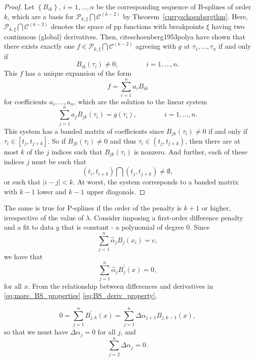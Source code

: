 \documentclass[12pt]{article}
\newcommand{\PP}{\mathcal{P}}
\theoremstyle{definition}
\begin{document}
\begin{enumerate}
\begin{description}
\begin{proof}
Let $\left\{ B_{ik} \right\}$, $i=1,\dots,n$ be the corresponding sequence of B-splines of order $k$, which are a basis for $\PP_{k,\xi} \bigcap \mathscr{C}^{\left(k-2\right)}$ by Theorem~\ref{curryschoenbergthm}. Here, $\PP_{k,\xi} \bigcap \mathscr{C}^{\left(k-2\right)}$ denotes the space of pp functions with breakpoints $\xi$ having two continuous (global) derivatives. Then, cite{schoenberg1953polya} have shown that there exists exactly one $f \in \PP_{k,\xi} \bigcap \mathscr{C}^{\left(k-2\right)}$ agreeing with $g$ at $\tau_1,\dots, \tau_n$ if and only if 
\[
B_{ik}\left(\tau_i\right) \ne 0, \qquad \qquad i=1,\dots,n.
\]
This $f$ has a unique expansion of the form
\[
f = \sum_{i=1}^n a_i B_{ik}
\] 
for coefficients $a_i,\dots, a_n$, which are the solution to the linear system
\[
\sum_{j=1}^n a_jB_{jk}\left(\tau_i\right) = g\left(\tau_i\right), \qquad \qquad i=1,\dots,n.
\]
This system has a banded matrix of coefficients since $B_{jk}\left(\tau_i\right) \ne 0$ if and only if $\tau_i \in \left[t_j,t_{j+k}\right]$. So if $B_{jk}\left(\tau_i\right) \ne 0$ and thus $\tau_i \in \left(t_j,t_{j+k}\right)$, then there are at most $k$ of the $j$ indices such that $B_{jk}\left(\tau_i\right)$ is nonzero. And further, each of these indices $j$ must be such that 
\[
\left(t_i,t_{i+k}\right) \bigcap \left(t_j,t_{j+k}\right) \ne \emptyset,
\]
or such that $\vert i-j \vert < k$. At worst, the system corresponds to a banded matrix with $k-1$ lower and $k-1$ upper diagonals. 
\end{proof}
The same is true for P-splines if the order of the penalty is $k+1$ or higher, irrespective of the value of $\lambda$. Consider imposing a first-order difference penalty and a fit to data $y$ that is constant - a polynomial of degree 0. Since 
\[
\sum_{j=1}^n \hat{\alpha}_j B_j\left( x_i \right) = c, 
\]
\noindent
we have that
\[
\sum_{j=1}^n \hat{\alpha}_j B^\prime_j\left( x \right) = 0, 
\]
\noindent
for all $x$. From the relationship between differences and derivatives in \ref{eq:more_BS_properties} \ref{eq:BS_deriv_property}, 

\[
0 = \sum_{j=1}^n B^\prime_{j,k}\left(x\right) = \sum_{j=1}^n \Delta\alpha_{j+1} B_{j,k-1}\left( x \right), 
\]
\noindent
so that we must have $\Delta \alpha_j = 0$ for all $j$, and 
\[
\sum_{j=2}^n \Delta \alpha_j = 0.
\]


\end{description}
\end{enumerate}
\end{document}
